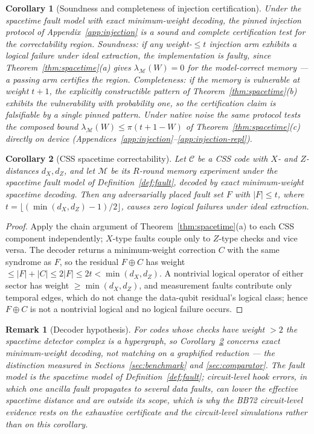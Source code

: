 \documentclass[11pt,a4paper]{article}
\newtheorem{corollary}{Corollary}\newtheorem{proposition}{Proposition}
\newtheorem{remark}{Remark}
\begin{document}
\begin{corollary}[Soundness and completeness of injection certification]
\label{cor:inj-cert}
Under the spacetime fault model with exact minimum-weight decoding, the
pinned injection protocol of Appendix~\ref{app:injection} is a sound and
complete certification test for the correctability region.
\emph{Soundness:} if any weight-$\le t$ injection arm exhibits a logical
failure under ideal extraction, the implementation is faulty, since
Theorem~\ref{thm:spacetime}(a) gives $\lambda_{\mathcal{M}}(W)=0$ for
the model-correct memory --- a passing arm certifies the region.
\emph{Completeness:} if the memory is vulnerable at weight $t{+}1$, the
explicitly constructible pattern of Theorem~\ref{thm:spacetime}(b)
exhibits the vulnerability with probability one, so the certification
claim is falsifiable by a single pinned pattern.
Under native noise the same protocol tests the composed bound
$\lambda_{\mathcal{M}}(W)\le\pi(t{+}1{-}W)$ of
Theorem~\ref{thm:spacetime}(c) directly on device
(Appendices~\ref{app:injection}--\ref{app:injection-repl}).
\end{corollary}

\begin{corollary}[CSS spacetime correctability]\label{cor:css}
Let $\mathcal{C}$ be a CSS code with $X$- and $Z$-distances $d_X,d_Z$,
and let $\mathcal{M}$ be its $R$-round memory experiment under the
spacetime fault model of Definition~\ref{def:fault}, decoded by exact
minimum-weight spacetime decoding. Then any adversarially placed fault
set $F$ with $|F|\le t$, where
$t=\lfloor(\min(d_X,d_Z)-1)/2\rfloor$, causes zero logical failures
under ideal extraction.
\end{corollary}
\begin{proof}
Apply the chain argument of Theorem~\ref{thm:spacetime}(a) to each CSS
component independently; $X$-type faults couple only to $Z$-type
checks and vice versa. The decoder returns a minimum-weight correction
$C$ with the same syndrome as $F$, so the residual $F\oplus C$ has
weight $\le|F|+|C|\le2|F|\le2t<\min(d_X,d_Z)$. A nontrivial logical
operator of either sector has weight $\ge\min(d_X,d_Z)$, and
measurement faults contribute only temporal edges, which do not change
the data-qubit residual's logical class; hence $F\oplus C$ is not a
nontrivial logical and no logical failure occurs.
\end{proof}
\begin{remark}[Decoder hypothesis]\label{rem:css-scope}
For codes whose checks have weight $>2$ the spacetime detector complex
is a hypergraph, so Corollary~\ref{cor:css} concerns exact
minimum-weight decoding, not matching on a graphified reduction ---
the distinction measured in Sections~\ref{sec:benchmark} and
\ref{sec:comparator}. The fault model is the spacetime model of
Definition~\ref{def:fault}; circuit-level hook errors, in which one
ancilla fault propagates to several data faults, can lower the
effective spacetime distance and are outside its scope, which is why
the BB72 circuit-level evidence rests on the exhaustive certificate
and the circuit-level simulations rather than on this corollary.
\end{remark}
\end{document}

